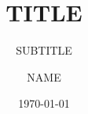 \documentclass[10pt]{beamer}
\title{TITLE}
\subtitle{SUBTITLE}
\author[NAME]{NAME}
\institute[]{Technische Universität Dortmund}
\date[\today]{\today}
\begin{document}



\beginbackup

\backupend
\end{document}
